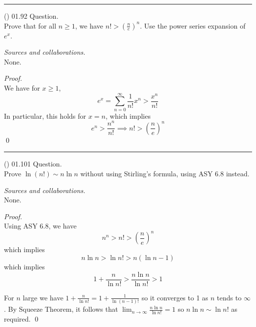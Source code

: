 \documentclass{amsart}
\begin{document}
\bigskip\hrule

\vspace{0.5cm}

\newpage
\Large
{}

\noindent
(\done) 01.92 Question. \\
Prove that for all $n \geq 1$, we have $n! > \left(\frac{n}{e}\right)^n$. Use the power series expansion of $e^x$.

\medskip\noindent
\emph{Sources and collaborations.}\\
None.

\medskip\noindent
\emph{Proof.}\\
We have for $x \geq 1$, \begin{equation*}
e^x = \sum_{n = 0}^{\infty} \frac{1}{n!}x^n >\frac{x^n}{n!}
\end{equation*}
In particular, this holds for $x = n$, which implies \begin{equation*}
e^n > \frac{n^n}{n!} \implies n! > \left(\frac{n}{e}\right)^n
\end{equation*}
\qed

\bigskip\hrule

\vspace{0.5cm}


\newpage
\Large
{}

\noindent
(\done) 01.101 Question. \\
Prove $\ln (n!) \sim n \ln n$ without using Stirling's formula, using ASY 6.8 instead.

\medskip\noindent
\emph{Sources and collaborations.}\\
None.

\medskip\noindent
\emph{Proof.}\\
Using ASY 6.8, we have
\begin{equation*}
n^n > n! > \left(\frac{n}{e}\right)^n
\end{equation*}
which implies
\begin{equation*}
n \ln n > \ln n! > n (\ln n - 1)
\end{equation*}
which implies
\begin{equation*}
1 + \frac{n}{\ln n!} > \frac{n \ln n}{\ln n!} > 1
\end{equation*}

For $n$ large we have $1 + \frac{n}{ \ln n!} = 1 + \frac{1}{\ln (n-1)!}$ so it converges to 1 as $n$ tends to $\infty$. By Squeeze Theorem, it follows that $\lim_{n \to \infty} \frac{n \ln n}{\ln n!} = 1$ so $n \ln n \sim \ln n!$ as required.
\qed
\end{document}
